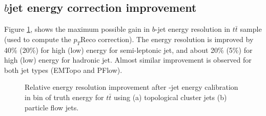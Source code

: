 \subsection{\texorpdfstring{$b$}-jet energy correction improvement}
\label{Jet:Cal:BCal:Result}
Figure \ref{fig:Jet:Cal:BCal:Result:E}, shows the maximum possible gain in $b$-jet energy resolution in $t\bar{t}$ sample (used to compute the $p_{T}$Reco correction). The energy resolution is improved by 40\% (20\%) for high (low) energy for semi-leptonic jet, and about 20\% (5\%) for high (low) energy for hadronic jet. Almost similar improvement is observed for both jet types (EMTopo and PFlow).
\begin{figure}[htbp]
   \centering
   \quad
   \begin{tcolorbox}[colback=black!5!white,colframe=white!75!black]
   \caption{Relative energy resolution improvement after \bq-jet energy calibration in bin of truth energy for $t\bar{t}$ using (a) topological cluster jets (b) particle flow jets.}
    \label{fig:Jet:Cal:BCal:Result:E}
   \end{tcolorbox}

\end{figure}

